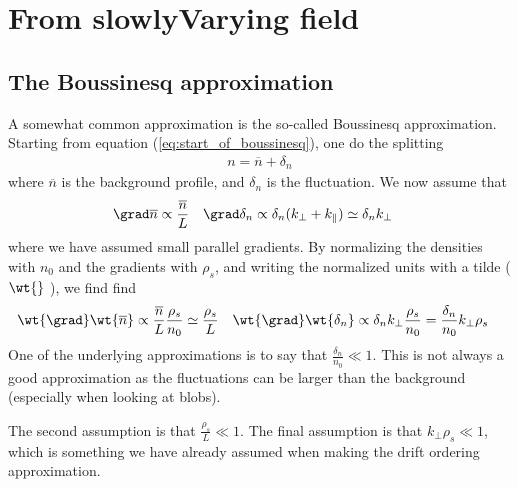 \section{From slowlyVarying field}
\subsection{The Boussinesq approximation}
\label{sec:boussinesq}
%
A somewhat common approximation is the so-called Boussinesq approximation.
Starting from equation (\ref{eq:start_of_boussinesq}), one do the splitting
%
\begin{align*}
    n = \overline{n} + \delta_n
\end{align*}
%
where $\overline{n}$ is the background profile, and $\delta_n$ is the fluctuation.
We now assume that
%
\begin{align*}
    &\grad \overline{n} \propto \frac{\overline{n}}{L}&
    &\grad \delta_n \propto \delta_n (k_\perp + k_\|) \simeq \delta_n k_\perp&
\end{align*}
%
where we have assumed small parallel gradients.  By normalizing the densities
with $n_0$ and the gradients with $\rho_s$, and writing the normalized units
with a tilde ( $ \wt{ } $ ), we find find
%
\begin{align*}
    &\wt{\grad} \wt{\overline{n}} \propto
    \frac{\overline{n}}{L}\frac{\rho_s}{n_0}
    \simeq \frac{\rho_s}{L}
    &
    &\wt{\grad} \wt{\delta_n} \propto \delta_n k_\perp\frac{\rho_s}{n_0}
    = \frac{\delta_n}{n_0}k_\perp\rho_s
    &
\end{align*}
%
One of the underlying approximations is to say that $\frac{\delta_n}{n_0} \ll
1$. This is not always a good approximation as the fluctuations can be larger
than the background (especially when looking at
blobs).

The second assumption is that $\frac{\rho_s}{L} \ll 1$. The final assumption is
that $k_\perp\rho_s \ll 1$, which is something we have already assumed
when making the drift ordering approximation.

